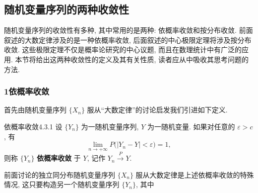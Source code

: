 \subsection{随机变量序列的两种收敛性}

随机变量序列的收敛性有多种, 其中常用的是两种: 依概率收敛和按分布收敛.
前面叙述的大数定律涉及的是一种依概率收敛, 后面叙述的中心极限定理将涉及按分布收敛.
这些极限定理不仅是概率论研究的中心议题, 而且在数理统计中有广泛的应用.
本节将给出这两种收敛性的定义及其有关性质, 读者应从中吸收其思考问题的方法.

\subsubsection{1依概率收敛}

首先由随机变量序列 $ \{ X_n \} $ 服从``大数定律''的讨论启发我们引进如下定义.

\begin{definition}{依概率收敛}{4.3.1}
    设 $ \{ Y_n \} $ 为一随机变量序列, $ Y $ 为一随机变量.
    如果对任意的 $ \varepsilon > c $, 有
    \begin{equation}\label{eq:4.3.1}
        \lim_{n \to +\infty} P \bigl( \bigr\lvert Y_n - Y \bigr\rvert < \varepsilon \bigr) = 1,
    \end{equation}
    则称 $ \{ Y_n \} $ \textbf{依概率收敛} 于 $ Y $, 记作 $ Y_n \stackrel{P}{\to} Y $.
\end{definition}

前面讨论的独立同分布随机变量序列 $ \{ X_n \} $ 服从大数定律是上述依概率收敛的特殊情况, 这只要构造另一个随机变量序列 $ \{ Y_n \} $, 其中